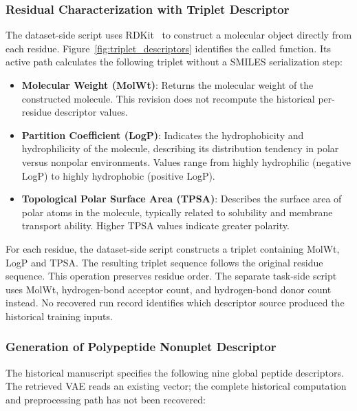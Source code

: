 \documentclass[journal]{IEEEtran}
\begin{document}
\subsubsection{Residual Characterization with Triplet Descriptor}

The dataset-side script uses RDKit~\cite{landrum2013rdkit} to construct a molecular object directly from each residue. Figure~\ref{fig:triplet_descriptors} identifies the called function. Its active path calculates the following triplet without a SMILES serialization step:

\begin{itemize}
\item \textbf{Molecular Weight (MolWt)}: Returns the molecular weight of the constructed molecule. This revision does not recompute the historical per-residue descriptor values.
\item \textbf{Partition Coefficient (LogP)}: Indicates the hydrophobicity and hydrophilicity of the molecule, describing its distribution tendency in polar versus nonpolar environments. Values range from highly hydrophilic (negative LogP) to highly hydrophobic (positive LogP).
\item \textbf{Topological Polar Surface Area (TPSA)}: Describes the surface area of polar atoms in the molecule, typically related to solubility and membrane transport ability. Higher TPSA values indicate greater polarity.
\end{itemize}

For each residue, the dataset-side script constructs a triplet containing MolWt, LogP and TPSA. The resulting triplet sequence follows the original residue sequence. This operation preserves residue order. The separate task-side script uses MolWt, hydrogen-bond acceptor count, and hydrogen-bond donor count instead. No recovered run record identifies which descriptor source produced the historical training inputs.

\subsubsection{Generation of Polypeptide Nonuplet Descriptor}

The historical manuscript specifies the following nine global peptide descriptors. The retrieved VAE reads an existing vector; the complete historical computation and preprocessing path has not been recovered:
\end{document}
